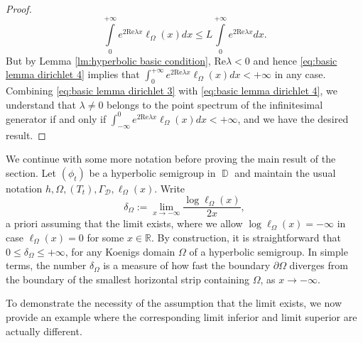 \documentclass[11pt]{amsart}
\numberwithin{equation}{section}
\theoremstyle{definition}
\DeclareMathOperator{\D}{\mathbb{D}}
\begin{document}
\begin{proof}
\begin{equation}
			\int\limits_{0}^{+\infty}e^{2\mathrm{Re}\lambda x}\ell_\Omega(x)dx \le L\int\limits_{0}^{+\infty}e^{2\mathrm{Re}\lambda x}dx.
		\end{equation}
		But by Lemma \ref{lm:hyperbolic basic condition}, $\mathrm{Re}\lambda<0$ and hence \eqref{eq:basic lemma dirichlet 4} implies that $\int_{0}^{+\infty}e^{2\mathrm{Re}\lambda x}\ell_\Omega(x)dx<+\infty$ in any case.  Combining \eqref{eq:basic lemma dirichlet 3} with \eqref{eq:basic lemma dirichlet 4}, we understand that $\lambda\ne0$ belongs to the point spectrum of the infinitesimal generator if and only if $\int_{-\infty}^{0}e^{2\mathrm{Re}\lambda x}\ell_\Omega(x)dx<+\infty$, and we have the desired result.
		
		
	\end{proof}
	
	We continue with some more notation before proving the main result of the section. Let $(\phi_t)$ be a hyperbolic semigroup in $\D$ and maintain the usual notation $h, \Omega, (T_t), \Gamma_\mathcal{D}, \ell_\Omega(x)$. Write
	$$\delta_\Omega:=\lim\limits_{x\to-\infty}\dfrac{\log\ell_\Omega(x)}{2x},$$
	a priori assuming that the limit exists, where we allow $\log\ell_\Omega(x)=-\infty$ in case $\ell_\Omega(x)=0$ for some $x\in\mathbb{R}$. By construction, it is straightforward that $0\le\delta_\Omega\le+\infty$, for any Koenigs domain $\Omega$ of a hyperbolic semigroup. In simple terms, the number $\delta_\Omega$ is a measure of how fast the boundary $\partial\Omega$ diverges from the boundary of the smallest horizontal strip containing $\Omega$, as $x\to-\infty$.
	
	To demonstrate the necessity of the assumption that the limit exists, we now provide an example where the corresponding limit inferior and limit superior are actually different.
	
\end{document}
